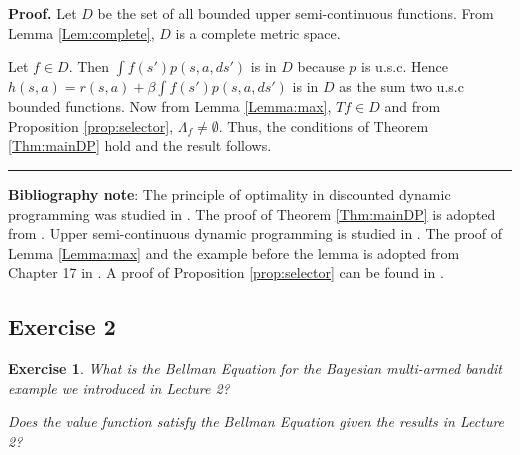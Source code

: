 \documentclass[letter,11pt]{article}
\newtheorem{exercise}{Exercise}[section]
\newenvironment {proof}[1][Proof]{\noindent \textbf {#1.} }{\ \rule {0.5em}{0.5em}}
\begin{document}
\begin{proof}
Let $D$ be the set of all bounded upper semi-continuous functions.  From Lemma \ref{Lem:complete}, $D$ is a complete metric space. 

Let $f \in D$. Then $ \int f(s') p(s,a,ds')$ is in $D$ because $p$ is u.s.c. Hence $h(s,a) = r(s,a) + \beta  \int f(s') p(s,a,ds')$ is in $D$ as the sum two u.s.c bounded functions. Now from Lemma \ref{Lemma:max}, $Tf \in D$ and from Proposition \ref{prop:selector}, $\Lambda_{f} \neq \emptyset$. Thus, the conditions of Theorem \ref{Thm:mainDP} hold and the result follows. 
\end{proof}


\textbf{Bibliography note}: The principle of optimality in  discounted dynamic programming  was studied in \cite{blackwell1965discounted}. The proof of Theorem \ref{Thm:mainDP} is adopted from \cite{light2024principle}. Upper semi-continuous dynamic programming is studied in \cite{maitra1968discounted}. The proof of Lemma \ref{Lemma:max} and the example before the lemma  is adopted from Chapter 17 in \cite{aliprantis2006infinite}. A proof of Proposition \ref{prop:selector} can be found in   \cite{savage1965gamble}. 



\subsection{Exercise 2}

\begin{exercise}
    What is the Bellman Equation for the Bayesian multi-armed bandit example we introduced in Lecture 2? 

      Does the value function satisfy the Bellman Equation given the results in Lecture 2?
\end{exercise}
\end{document}
